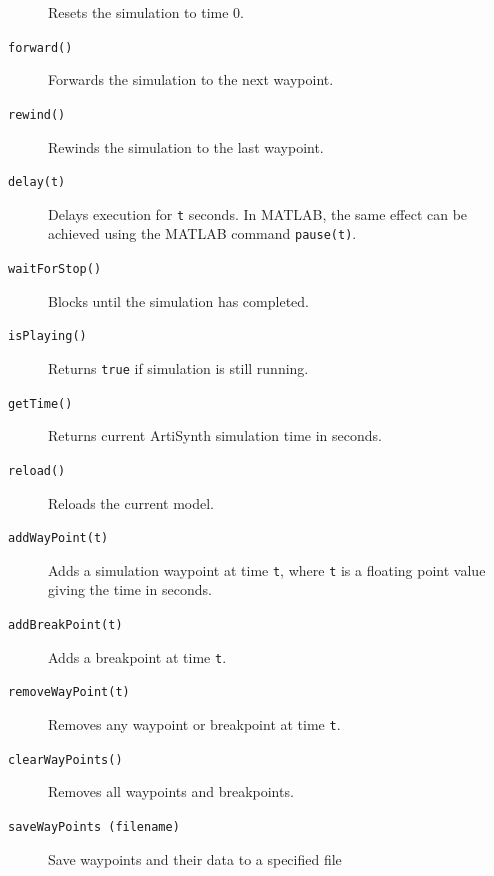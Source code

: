 \documentclass{article}
\begin{document}
\begin{description}
Resets the simulation to time 0.

\item[{\tt forward()}] \mbox{}

Forwards the simulation to the next waypoint.

\item[{\tt rewind()}] \mbox{}

Rewinds the simulation to the last waypoint.

\item[{\tt delay(t)}] \mbox{}

Delays execution for {\tt t} seconds. In MATLAB, the same effect can
be achieved using the MATLAB command {\tt pause(t)}.

\item[{\tt waitForStop()}] \mbox{}

Blocks until the simulation has completed.

\item[{\tt isPlaying()}] \mbox{}

Returns {\tt true} if simulation is still running.

\item[{\tt getTime()}] \mbox{}

Returns current ArtiSynth simulation time in seconds.

\item[{\tt reload()}] \mbox{}

Reloads the current model.

\item[{\tt addWayPoint(t)}] \mbox{}

Adds a simulation waypoint at time {\tt t},
where {\tt t} is a floating point value giving
the time in seconds.

\item[{\tt addBreakPoint(t)}] \mbox{}

Adds a breakpoint at time {\tt t}.

\item[{\tt removeWayPoint(t)}] \mbox{}

Removes any waypoint or breakpoint at time {\tt t}.

\item[{\tt clearWayPoints()}] \mbox{}

Removes all waypoints and breakpoints.

\item[{\tt saveWayPoints (filename)}] \mbox{}

Save waypoints and their data to a specified file


\end{description}
\end{document}
